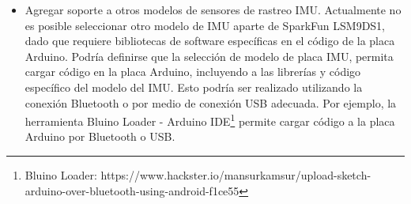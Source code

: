 \begin{itemize}
	\item	 Agregar soporte a otros modelos de sensores de rastreo IMU. Actualmente no es posible seleccionar otro modelo de IMU aparte de SparkFun LSM9DS1, dado que requiere bibliotecas de software específicas en el código de la placa Arduino. Podría definirse que la selección de modelo de placa IMU, permita cargar código en la placa Arduino, incluyendo a las librerías y código específico del modelo del IMU. Esto podría ser realizado utilizando la conexión Bluetooth o por medio de conexión USB adecuada. Por ejemplo, la herramienta Bluino Loader - Arduino IDE\footnote{Bluino Loader: https://www.hackster.io/mansurkamsur/upload-sketch-arduino-over-bluetooth-using-android-f1ce55} permite cargar código a la placa Arduino por Bluetooth o USB.
\end{itemize}